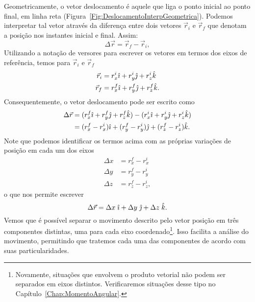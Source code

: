 Geometricamente, o vetor deslocamento é aquele que liga o ponto inicial ao ponto final, em linha reta (Figura~\ref{Fig:DeslocamentoInterpGeometrica}). Podemos interpretar tal vetor através da diferença entre dois vetores $\vec{r}_i$ e $\vec{r}_f$ que denotam a posição nos instantes inicial e final. Assim:
\begin{equation}
  \Delta\vec{r} = \vec{r}_f - \vec{r}_i,
\end{equation}
%
Utilizando a notação de versores para escrever os vetores em termos dos eixos de referência, temos para $\vec{r}_i$ e $\vec{r}_f$
\begin{align}
  \vec{r}_i &= r_x^i \hat{\imath} + r_y^i \hat{\jmath} + r_z^i \hat{k} \\
  \vec{r}_f &= r_x^f \hat{\imath} + r_y^f \hat{\jmath} + r_z^f \hat{k}.
\end{align}
%
Consequentemente, o vetor deslocamento pode ser escrito como
\begin{align}
  \Delta\vec{r} &= (r_x^f \hat{\imath} + r_y^f \hat{\jmath} + r_z^f \hat{k}) - (r_x^i \hat{\imath} + r_y^i \hat{\jmath} + r_z^i \hat{k}) \\
  &= (r_x^f - r_x^i)\hat{\imath} + (r_y^f - r_y^i)\hat{\jmath} + (r_z^f - r_z^i)\hat{k}.
\end{align}
%
Note que podemos identificar os termos acima com as próprias variações de posição em cada um dos eixos
\begin{align}
    \Delta x &= r_x^f - r_x^i \\
    \Delta y &= r_y^f - r_y^i \\
    \Delta z &= r_z^f - r_z^i,
\end{align}
%
o que nos permite escrever
\begin{equation}
  \Delta\vec{r} = \Delta x \; \hat{\imath} + \Delta y \; \hat{\jmath} + \Delta z \; \hat{k}.
\end{equation}
%
Vemos que é possível separar o movimento descrito pelo vetor posição em três componentes distintas, uma para cada eixo coordenado\footnote{Novamente, situações que envolvem o produto vetorial não podem ser separados em eixos distintos. Verificaremos situações desse tipo no Capítulo~\ref{Chap:MomentoAngular}.}. Isso facilita a análise do movimento, permitindo que tratemos cada uma das componentes de acordo com suas particularidades.

